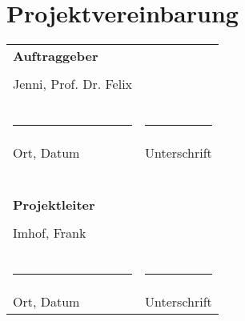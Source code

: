 \section{Projektvereinbarung}
\begin{tabular}{l l}
\textbf{Auftraggeber} &\\
&\\
Jenni, Prof. Dr. Felix& \\
&\\
&\\
&\\
\rule{6cm}{0.5pt} & \rule{6cm}{0.5pt}\\
Ort, Datum & Unterschrift\\
&\\
&\\
&\\
&\\
&\\
&\\
\textbf{Projektleiter} &\\
&\\
Imhof, Frank &\\
&\\
&\\
&\\
\rule{6cm}{0.5pt} & \rule{6cm}{0.5pt}\\
Ort, Datum & Unterschrift\\
\end{tabular}

